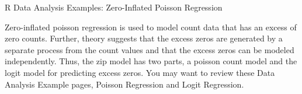 

R Data Analysis Examples: Zero-Inflated Poisson Regression

Zero-inflated poisson regression is used to model count data that has an excess of zero counts. Further, theory suggests that the excess zeros are generated by a separate process from the count values and that the excess zeros can be modeled independently. Thus, the zip model has two parts, a poisson count model and the logit model for predicting excess zeros. You may want to review these Data Analysis Example pages, Poisson Regression and Logit Regression.
